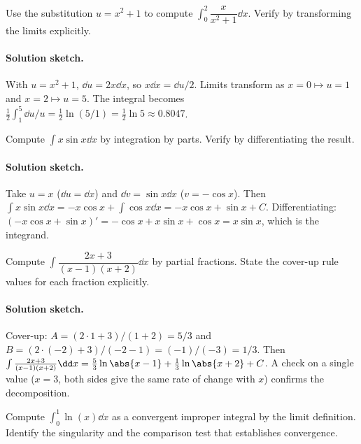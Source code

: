 \begin{exercise}
Use the substitution $u = x^{2} + 1$ to compute
$\int_{0}^{2} \dfrac{x}{x^{2} + 1} \dd x$. Verify by transforming
the limits explicitly.
\end{exercise}

\paragraph{Solution sketch.}
With $u = x^{2} + 1$, $\dd u = 2x \dd x$, so $x \dd x = \dd u /
2$. Limits transform as $x = 0 \mapsto u = 1$ and $x = 2 \mapsto
u = 5$. The integral becomes
$\tfrac{1}{2}\int_{1}^{5} \dd u / u = \tfrac{1}{2}\ln(5/1) =
\tfrac{1}{2}\ln 5 \approx 0.8047$.

\begin{exercise}
Compute $\int x \sin x \dd x$ by integration by parts. Verify by
differentiating the result.
\end{exercise}

\paragraph{Solution sketch.}
Take $u = x$ ($\dd u = \dd x$) and $\dd v = \sin x \dd x$ ($v =
-\cos x$). Then $\int x \sin x \dd x = -x \cos x + \int \cos x
\dd x = -x \cos x + \sin x + C$. Differentiating: $(-x \cos x +
\sin x)' = -\cos x + x \sin x + \cos x = x \sin x$, which is the
integrand.

\begin{exercise}
Compute $\int \dfrac{2x + 3}{(x - 1)(x + 2)} \dd x$ by partial
fractions. State the cover-up rule values for each fraction
explicitly.
\end{exercise}

\paragraph{Solution sketch.}
Cover-up: $A = (2 \cdot 1 + 3)/(1 + 2) = 5/3$ and $B = (2 \cdot
(-2) + 3)/(-2 - 1) = (-1)/(-3) = 1/3$. Then
$\int \tfrac{2x + 3}{(x-1)(x+2)} \dd x = \tfrac{5}{3}\ln\abs{x-1}
+ \tfrac{1}{3}\ln\abs{x+2} + C$. A check on a single value
($x = 3$, both sides give the same rate of change with $x$)
confirms the decomposition.

\begin{exercise}
Compute $\int_{0}^{1} \ln(x) \dd x$ as a convergent improper
integral by the limit definition. Identify the singularity and
the comparison test that establishes convergence.
\end{exercise}


